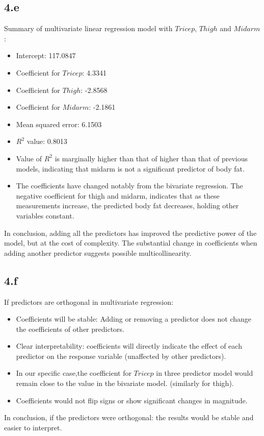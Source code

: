 \documentclass[12pt]{article}
\begin{document}
\subsection*{4.e}
Summary of multivariate linear regression model with \(Tricep\), \(Thigh\) and
\(Midarm\):
\begin{itemize}
    \item Intercept: 117.0847
    \item Coefficient for \(Tricep\): 4.3341
    \item Coefficient for \(Thigh\): -2.8568
    \item Coefficient for \(Midarm\): -2.1861
    \item Mean squared error: 6.1503
    \item \(R^2\) value: 0.8013
    \item Value of \(R^2\) is marginally higher than that of higher than that
    of previous models, indicating that midarm is not a significant predictor
    of body fat.
    \item The coefficients have changed notably from the bivariate regression.
    The negative coefficient for thigh and midarm, indicates that as these
    measurements increase, the predicted body fat decreases,
    holding other variables constant.
\end{itemize}
In conclusion, adding all the predictors has improved the predictive power of
the model, but at the cost of complexity. The substantial change in coefficients
when adding another predictor suggests possible multicollinearity.

\newpage
\subsection*{4.f}
If predictors are orthogonal in multivariate regression:
\begin{itemize}
    \item Coefficients will be stable: Adding or removing a predictor does not
    change the coefficients of other predictors.
    \item Clear interpretability: coefficients will directly indicate the effect
    of each predictor on the response variable (unaffected by other predictors).
    \item In our specific case,the coefficient for \(Tricep\)  in three predictor
    model would remain close to the value in the bivariate model. (similarly for thigh).
    \item Coefficients would not flip signs or show significant changes in magnitude.
\end{itemize}
In conclusion, if the predictors were orthogonal: the results would be stable
and easier to interpret.
\end{document}
